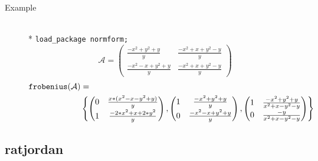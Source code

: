 \begin{description}
\item[Example]\mbox{}\\*
\texttt{load\_package normform;}
\[
\mathcal{A} = \begin{pmatrix} \frac{-x^2+y^2+y}{y} &
\frac{-x^2+x+y^2-y}{y} \\[1mm] \frac{-x^2-x+y^2+y}{y} & \frac{-x^2+x+y^2-y}
{y} \end{pmatrix}
\]
\[
\begin{split}
\texttt{frobenius}(\mathcal{A}) &=  \\
&\left\{
   \begin{pmatrix} 0 & \frac{x*(x^2-x-y^2+y)}{y} \\[1mm]
                   1 & \frac{-2*x^2+x+2*y^2}{y} \end{pmatrix},
   \begin{pmatrix}
     1 & \frac{-x^2+y^2+y}{y} \\[1mm] 0 & \frac{-x^2-x+y^2+y}{y}
   \end{pmatrix},
   \begin{pmatrix} 1 & \frac{-x^2+y^2+y}{x^2+x-y^2-y} \\[1mm]
      0 & \frac{-y}{x^2+x-y^2-y} \end{pmatrix}
 \right\}
\end{split}
\]
\end{description}

\subsection{ratjordan}

